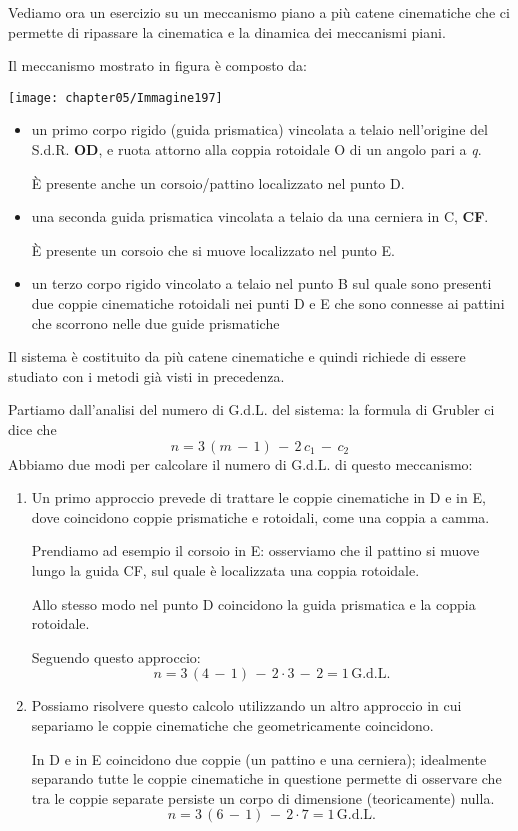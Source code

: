 Vediamo ora un esercizio su un meccanismo piano a più catene cinematiche che ci permette di ripassare la cinematica e la dinamica dei meccanismi piani.

Il meccanismo mostrato in figura è composto da:

\begin{minipage}{.5\textwidth}
\centering
\texttt{[image: chapter05/Immagine197]}
\end{minipage}
\hfill
\begin{minipage}{.5\textwidth}
\begin{itemize}
\item un primo corpo rigido (guida prismatica) vincolata a telaio nell'origine del S.d.R. \textbf{OD}, e ruota attorno alla coppia rotoidale O di un angolo pari a \emph{q}.

È presente anche un corsoio/pattino localizzato nel punto D.
\item una seconda guida prismatica vincolata a telaio da una cerniera in C, \textbf{CF}.

È presente un corsoio che si muove localizzato nel punto E.
\item un terzo corpo rigido vincolato a telaio nel punto B sul quale sono presenti due coppie cinematiche rotoidali nei punti D e E che sono connesse ai pattini che scorrono nelle due guide prismatiche
\end{itemize}
\end{minipage}
\vspace{2mm}

Il sistema è costituito da più catene cinematiche e quindi richiede di essere studiato con i metodi già visti in precedenza.

Partiamo dall'analisi del numero di G.d.L. del sistema: la formula di Grubler ci dice che 
\[n = 3\,(m\,-\,1)\,-\,2\,c_1\,-\,c_2\]
Abbiamo due modi per calcolare il numero di G.d.L. di questo meccanismo:
\begin{enumerate}
\item Un primo approccio prevede di trattare le coppie cinematiche in D e in E, dove coincidono coppie prismatiche e rotoidali, come una coppia a camma.

Prendiamo ad esempio il corsoio in E: osserviamo che il pattino si muove lungo la guida CF, sul quale è localizzata una coppia rotoidale.

Allo stesso modo nel punto D coincidono la guida prismatica e la coppia rotoidale.

Seguendo questo approccio:
\[n = 3\,(4\,-\,1)\,-\,2\cdot3\,-\,2 = 1\,\text{G.d.L.}\]
\item Possiamo risolvere questo calcolo utilizzando un altro approccio in cui separiamo le coppie cinematiche che geometricamente coincidono.

In D e in E coincidono due coppie (un pattino e una cerniera); idealmente separando tutte le coppie cinematiche in questione permette di osservare che tra le coppie separate persiste un corpo di dimensione (teoricamente) nulla.
\[n = 3\,(6\,-\,1)\,-\,2\cdot7 = 1\,\text{G.d.L.}\]
\end{enumerate}

